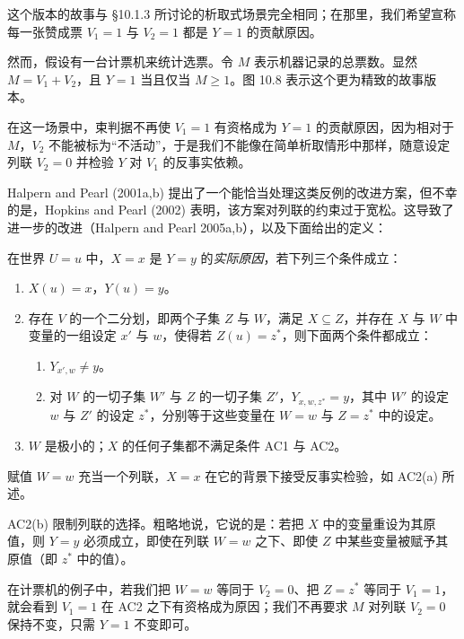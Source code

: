 这个版本的故事与 \S 10.1.3 所讨论的析取式场景完全相同；在那里，我们希望宣称每一张赞成票 $V_1=1$ 与 $V_2=1$ 都是 $Y=1$ 的贡献原因。

然而，假设有一台计票机来统计选票。令 $M$ 表示机器记录的总票数。显然 $M=V_1+V_2$，且 $Y=1$ 当且仅当 $M\ge 1$。图 10.8 表示这个更为精致的故事版本。

在这一场景中，束判据不再使 $V_1=1$ 有资格成为 $Y=1$ 的贡献原因，因为相对于 $M$，$V_2$ 不能被标为“不活动”，于是我们不能像在简单析取情形中那样，随意设定列联 $V_2=0$ 并检验 $Y$ 对 $V_1$ 的反事实依赖。

Halpern and Pearl (2001a,b) 提出了一个能恰当处理这类反例的改进方案，但不幸的是，Hopkins and Pearl (2002) 表明，该方案对列联的约束过于宽松。这导致了进一步的改进（Halpern and Pearl 2005a,b），以及下面给出的定义：

\begin{definition}
在世界 $U=u$ 中，$X=x$ 是 $Y=y$ 的\emph{实际原因}，若下列三个条件成立：
\begin{enumerate}[label=AC\arabic*.,leftmargin=3.4em]
\item $X(u)=x$，$Y(u)=y$。
\item 存在 $V$ 的一个二分划，即两个子集 $Z$ 与 $W$，满足 $X\subseteq Z$，并存在 $X$ 与 $W$ 中变量的一组设定 $x'$ 与 $w$，使得若 $Z(u)=z^*$，则下面两个条件都成立：
\begin{enumerate}[label=(\alph*),leftmargin=1.8em]
\item $Y_{x',w}\neq y$。
\item 对 $W$ 的一切子集 $W'$ 与 $Z$ 的一切子集 $Z'$，$Y_{x,w,z^*}=y$，其中 $W'$ 的设定 $w$ 与 $Z'$ 的设定 $z^*$，分别等于这些变量在 $W=w$ 与 $Z=z^*$ 中的设定。
\end{enumerate}
\item $W$ 是极小的；$X$ 的任何子集都不满足条件 AC1 与 AC2。
\end{enumerate}
\end{definition}

赋值 $W=w$ 充当一个列联，$X=x$ 在它的背景下接受反事实检验，如 AC2(a) 所述。

AC2(b) 限制列联的选择。粗略地说，它说的是：若把 $X$ 中的变量重设为其原值，则 $Y=y$ 必须成立，即使在列联 $W=w$ 之下、即使 $Z$ 中某些变量被赋予其原值（即 $z^*$ 中的值）。

在计票机的例子中，若我们把 $W=w$ 等同于 $V_2=0$、把 $Z=z^*$ 等同于 $V_1=1$，就会看到 $V_1=1$ 在 AC2 之下有资格成为原因；我们不再要求 $M$ 对列联 $V_2=0$ 保持不变，只需 $Y=1$ 不变即可。

